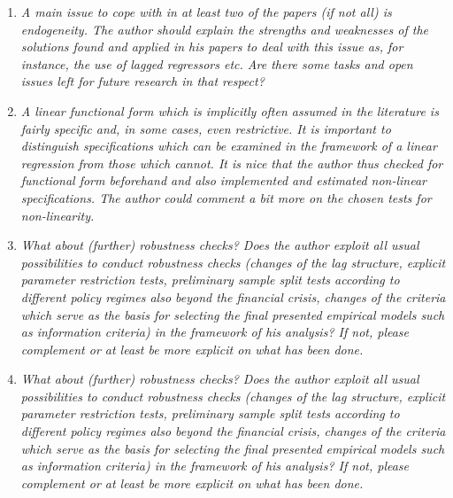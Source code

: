 


\begin{enumerate}
    \item \textit{A main issue to cope with in at least two of the papers (if not all) is endogeneity. The author should explain the strengths and weaknesses of the solutions found and applied in his papers to deal with this issue as, for instance, the use of lagged regressors etc. Are there some tasks and open issues left for future research in that respect?}
    
    \item \textit{A linear functional form which is implicitly often assumed in the literature is fairly specific and, in some cases, even restrictive. It is important to distinguish specifications which can be examined in the framework of a linear regression from those which cannot. It is nice that the author thus checked for functional form beforehand and also implemented and estimated non-linear specifications. The author could comment a bit more on the chosen tests for non-linearity.}
    
    \item \textit{What about (further) robustness checks? Does the author exploit all usual possibilities to conduct robustness checks (changes of the lag structure, explicit parameter restriction tests, preliminary sample split tests according to different policy regimes also beyond the financial crisis, changes of the criteria which serve as the basis for selecting the final presented empirical models such as information criteria) in the framework of his analysis? If not, please complement or at least be more explicit on what has been done.}

    \item \textit{What about (further) robustness checks? Does the author exploit all usual possibilities to conduct robustness checks (changes of the lag structure, explicit parameter restriction tests, preliminary sample split tests according to different policy regimes also beyond the financial crisis, changes of the criteria which serve as the basis for selecting the final presented empirical models such as information criteria) in the framework of his analysis? If not, please complement or at least be more explicit on what has been done.}


\end{enumerate}
